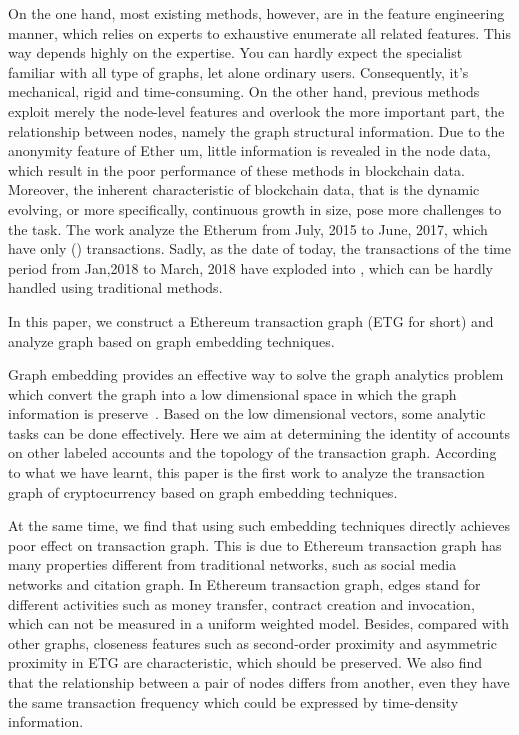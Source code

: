 On the one hand, most existing methods, however, are in the feature engineering manner, which relies on experts to exhaustive enumerate all related features. This way  depends highly on the expertise. You can hardly expect the specialist familiar with all type of graphs, let alone ordinary users. Consequently, it's mechanical, rigid and time-consuming. On the other hand, previous methods exploit merely  the node-level features and overlook the more important part, the relationship between nodes, namely the graph structural information. Due to  the anonymity feature of Ether um, little  information is revealed in the node data, which result in the poor performance of these methods in blockchain data.    Moreover, the  inherent characteristic of blockchain data, that is the dynamic evolving, or more specifically, continuous growth in size, pose more challenges to the task. The work \cite{chen2018infocom} analyze the Etherum   from  July, 2015 to June, 2017, which have only () transactions. Sadly, as the date of today, the transactions of the time period from Jan,2018 to March, 2018 have exploded into , which can be hardly handled using traditional methods.




 In this paper, we construct a Ethereum transaction graph (ETG for short) and analyze graph based on graph embedding techniques.

 Graph embedding provides an effective way to solve the graph analytics problem which convert the graph into a low dimensional space in which the graph information is preserve~\cite{cai2018comprehensive}. Based on the low dimensional vectors, some analytic tasks can be done effectively. Here we aim at determining the identity of accounts on other labeled accounts and the topology of the transaction graph. According to what we have learnt, this paper is the first work to analyze the transaction graph of cryptocurrency based on graph embedding techniques.

At the same time, we find that using such embedding techniques directly achieves poor effect on transaction graph. This is due to Ethereum transaction graph has many properties different from traditional networks, such as social media networks and citation graph. In Ethereum transaction graph, edges stand for different activities such as money transfer, contract creation and invocation, which can not be measured in a uniform weighted model. Besides, compared with other graphs, closeness features such as second-order proximity and asymmetric proximity in ETG are characteristic, which should be preserved. We also find that the relationship between a pair of nodes differs from another, even they have the same transaction frequency which could be expressed by time-density information.

